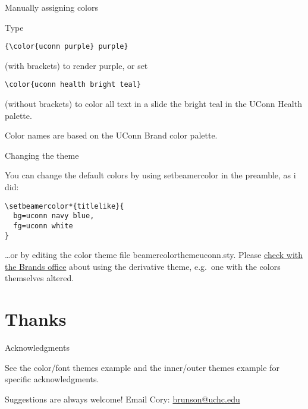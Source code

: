 \documentclass{beamer}
\begin{document}
\begin{frame}[fragile]{Manually assigning colors}

Type
\begin{verbatim}
{\color{uconn purple} purple}
\end{verbatim}
(with brackets) to render {\color{uconn purple} purple}, or set
\begin{verbatim}
\color{uconn health bright teal}
\end{verbatim}
\color{uconn health bright teal}
(without brackets) to color all text in a slide the bright teal in the UConn Health palette.

\color{black}\vfill
Color names are based on the UConn Brand color palette.

\center\href{http://brand.uconn.edu/standards/color-palette/}{}

\end{frame}


\begin{frame}[fragile]{Changing the theme}

You can change the default colors by using setbeamercolor in the preamble, as i did:
\begin{verbatim}
\setbeamercolor*{titlelike}{
  bg=uconn navy blue,
  fg=uconn white
}
\end{verbatim}
\ldots or by editing the color theme file {\ttfamily beamercolorthemeuconn.sty}.
Please \hyperlink{mailto:brand@uconn.edu}{check with the Brands office} about using the derivative theme, e.g.\ one with the colors themselves altered.

\end{frame}


\section{Thanks}


\begin{frame}{Acknowledgments}
\label{slide:acknowledgments}

See the color/font themes example and the inner/outer themes example for specific acknowledgments.

Suggestions are always welcome! Email Cory: \href{mailto:brunson@uchc.edu}{\ttfamily brunson@uchc.edu}

\end{frame}
\end{document}
